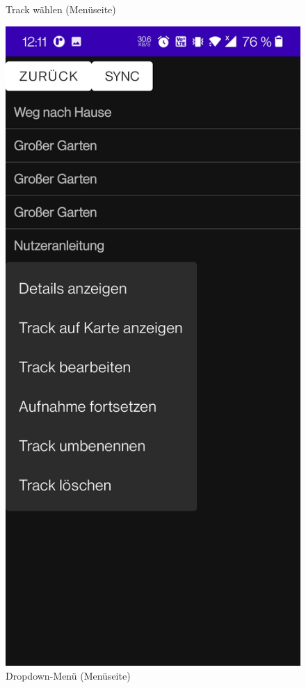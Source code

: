 \documentclass{article}
\begin{document}
\begin{figure}[H]
		  \centering
		  \caption{Track wählen (Menüseite)}
		\endminipage\hfill
		  \includegraphics[width=\linewidth]{3_menu3.jpg}
		  \centering
		  \caption{Dropdown-Menü (Menüseite)}
		\endminipage
	\end{figure}
	
\end{document}
